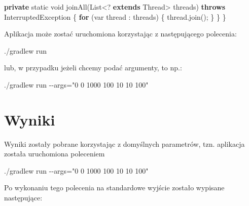 \documentclass[11pt]{article}
\newenvironment{Shaded}{}{}
\newcommand{\KeywordTok}[1]{\textcolor[rgb]{0.00,0.44,0.13}{\textbf{{#1}}}}
\newcommand{\DataTypeTok}[1]{\textcolor[rgb]{0.56,0.13,0.00}{{#1}}}
\newcommand{\StringTok}[1]{\textcolor[rgb]{0.25,0.44,0.63}{{#1}}}
\newcommand{\FunctionTok}[1]{\textcolor[rgb]{0.02,0.16,0.49}{{#1}}}
\newcommand{\NormalTok}[1]{{#1}}
\newcommand{\ControlFlowTok}[1]{\textcolor[rgb]{0.00,0.44,0.13}{\textbf{{#1}}}}
\newcommand{\OperatorTok}[1]{\textcolor[rgb]{0.40,0.40,0.40}{{#1}}}
\newcommand{\BuiltInTok}[1]{{#1}}
\newcommand{\ExtensionTok}[1]{{#1}}
\newcommand{\AttributeTok}[1]{\textcolor[rgb]{0.49,0.56,0.16}{{#1}}}
\begin{document}
\begin{Shaded}
\begin{Highlighting}[]
    \KeywordTok{private} \DataTypeTok{static} \DataTypeTok{void} \FunctionTok{joinAll}\OperatorTok{(}\BuiltInTok{List}\OperatorTok{\textless{}?} \KeywordTok{extends} \BuiltInTok{Thread}\OperatorTok{\textgreater{}}\NormalTok{ threads}\OperatorTok{)}
        \KeywordTok{throws} \BuiltInTok{InterruptedException}
    \OperatorTok{\{}
        \ControlFlowTok{for} \OperatorTok{(}\DataTypeTok{var}\NormalTok{ thread }\OperatorTok{:}\NormalTok{ threads}\OperatorTok{)} \OperatorTok{\{}
\NormalTok{            thread}\OperatorTok{.}\FunctionTok{join}\OperatorTok{();}
        \OperatorTok{\}}
    \OperatorTok{\}}
\OperatorTok{\}}
\end{Highlighting}
\end{Shaded}

    Aplikacja może zostać uruchomiona korzystając z następującego polecenia:

\begin{Shaded}
\begin{Highlighting}[]
\ExtensionTok{./gradlew}\NormalTok{ run}
\end{Highlighting}
\end{Shaded}

lub, w przypadku jeżeli chcemy podać argumenty, to np.:

\begin{Shaded}
\begin{Highlighting}[]
\ExtensionTok{./gradlew}\NormalTok{ run }\AttributeTok{{-}{-}args}\OperatorTok{=}\StringTok{"0 0 1000 100 10 10 100"}
\end{Highlighting}
\end{Shaded}

    \hypertarget{wyniki}{%
\section{Wyniki}\label{wyniki}}

Wyniki zostały pobrane korzystając z domyślnych parametrów, tzn.
aplikacja została uruchomiona poleceniem

\begin{Shaded}
\begin{Highlighting}[]
\ExtensionTok{./gradlew}\NormalTok{ run }\AttributeTok{{-}{-}args}\OperatorTok{=}\StringTok{"0 0 1000 100 10 10 100"}
\end{Highlighting}
\end{Shaded}

Po wykonaniu tego polecenia na standardowe wyjście zostało wypisane
następujące:
\end{document}
